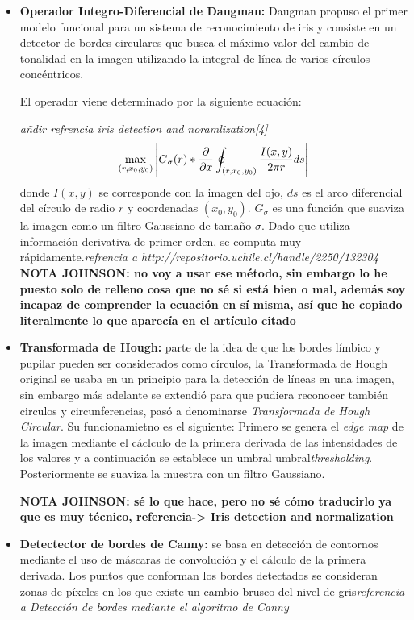 \begin{itemize}
    \item\textbf{Operador Integro-Diferencial de Daugman:} Daugman propuso el primer modelo funcional para un sistema de reconocimiento de iris y consiste en un detector de bordes circulares que busca el máximo valor del cambio de tonalidad en la imagen utilizando la integral de línea de varios círculos concéntricos.
    
    El operador viene determinado por la siguiente ecuación:
    
    \emph{añdir refrencia iris detection and noramlization[4]}
    \begin{equation*}
    \max_{\substack(r,x_{0},y_{0})}\left | G_{\sigma }(r)*\frac{\partial }{\partial x}\oint_{(r,x_{0},y_{0})} \frac{I(x,y)}{2\pi r}ds \right |
    \end{equation*}
    donde $I(x,y)$ se corresponde con la imagen del ojo, $ds$ es el arco diferencial del círculo de radio $r$ y coordenadas $(x_{0},y_{0})$. $G_{\sigma}$
    es una función que suaviza la imagen como un filtro Gaussiano de tamaño $\sigma$. Dado que utiliza información derivativa de primer orden, se computa muy rápidamente.\emph{refrencia a http://repositorio.uchile.cl/handle/2250/132304}
    \textbf{NOTA JOHNSON: no voy a usar ese método, sin embargo lo he puesto solo de relleno cosa que no sé si está bien o mal, además soy incapaz de comprender la ecuación en sí misma, así que he copiado literalmente lo que aparecía en el artículo citado}
    \item\textbf{Transformada de Hough:} parte de la idea de que los bordes límbico y pupilar pueden ser considerados como círculos, la Transformada de Hough original se usaba en un principio para la detección de líneas en una imagen, sin embargo más adelante se extendió para que pudiera reconocer también circulos y circunferencias, pasó a denominarse \emph{Transformada de Hough Circular}.
    Su funcionamietno es el siguiente:
    Primero se genera el \emph{edge map} de la imagen mediante el cáclculo de la primera derivada de las intensidades de los valores y a continuación se establece un umbral umbral\emph{thresholding}. Posteriormente se suaviza la muestra con un filtro Gaussiano.
    
    \textbf{NOTA JOHNSON: sé lo que hace, pero no sé cómo traducirlo ya que es muy técnico, referencia-> Iris detection and normalization}
    
    \item\textbf{Detectector de bordes de Canny:} se basa en detección de contornos mediante el uso de máscaras de convolución y el cálculo de la primera derivada.
    Los puntos que conforman los bordes detectados se consideran zonas de píxeles en los que existe un cambio brusco del nivel de gris\emph{referencia a Detección de bordes mediante el algoritmo de Canny}
\end{itemize}

